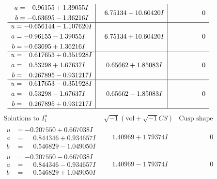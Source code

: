 \documentclass[1p]{elsarticle_modified}
\theoremstyle{definition}
\newcommand{\I}{\sqrt{-1}}
\begin{document}
$$\begin{array}{c|c|c}
\begin{aligned}
a &= -0.96155 + 1.39055 I \\
b &= -0.63695 - 1.36216 I\end{aligned}
 & \phantom{-}6.75134 - 10.60420 I & \phantom{-0.000000 } 0 \\ \hline\begin{aligned}
u &= -0.656144 - 1.107620 I \\
a &= -0.96155 - 1.39055 I \\
b &= -0.63695 + 1.36216 I\end{aligned}
 & \phantom{-}6.75134 + 10.60420 I & \phantom{-0.000000 } 0 \\ \hline\begin{aligned}
u &= \phantom{-}0.617653 + 0.351928 I \\
a &= \phantom{-}0.53298 + 1.67637 I \\
b &= \phantom{-}0.267895 - 0.931217 I\end{aligned}
 & \phantom{-}0.65662 + 1.85083 I & \phantom{-0.000000 } 0 \\ \hline\begin{aligned}
u &= \phantom{-}0.617653 - 0.351928 I \\
a &= \phantom{-}0.53298 - 1.67637 I \\
b &= \phantom{-}0.267895 + 0.931217 I\end{aligned}
 & \phantom{-}0.65662 - 1.85083 I & \phantom{-0.000000 } 0\\
 \hline 
 \end{array}$$\newpage$$\begin{array}{c|c|c}  
\text{Solutions to }I^u_{1}& \I (\text{vol} + \sqrt{-1}CS) & \text{Cusp shape}\\
 \hline 
\begin{aligned}
u &= -0.207550 + 0.667038 I \\
a &= \phantom{-}0.844346 + 0.934657 I \\
b &= \phantom{-}0.546829 - 1.049050 I\end{aligned}
 & \phantom{-}1.40969 + 1.79374 I & \phantom{-0.000000 } 0 \\ \hline\begin{aligned}
u &= -0.207550 - 0.667038 I \\
a &= \phantom{-}0.844346 - 0.934657 I \\
b &= \phantom{-}0.546829 + 1.049050 I\end{aligned}
 & \phantom{-}1.40969 - 1.79374 I & \phantom{-0.000000 } 0 \\ \hline\begin{aligned}

\end{aligned}
\end{array}$$
\end{document}
